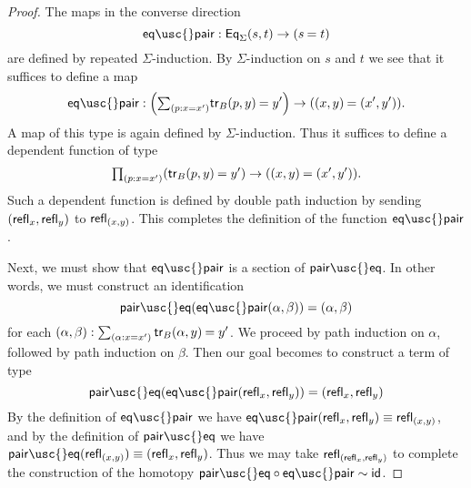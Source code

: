 \begin{proof}
The maps in the converse direction
\begin{equation*}
\mathsf{eq\usc{}pair} : \mathsf{Eq}_\Sigma(s,t)\to(\id{s}{t})
\end{equation*}
are defined by repeated $\Sigma$-induction. By $\Sigma$-induction on $s$ and $t$  we see that it suffices to define a map
\begin{equation*}
\mathsf{eq\usc{}pair} : \Big(\sm{p:x=x'}\id{\mathsf{tr}_B(p,y)}{y'}\Big)\to(\id{(x,y)}{(x',y')}).
\end{equation*}
A map of this type is again defined by $\Sigma$-induction. Thus it suffices to define a dependent function of type
\begin{equation*}
\prd{p:x=x'} (\id{\mathsf{tr}_B(p,y)}{y'}) \to (\id{(x,y)}{(x',y')}).
\end{equation*}
Such a dependent function is defined by double path induction by sending ${\mathopen{}(\mathsf{refl}_{x},\mathsf{refl}_{y})\mathclose{}}$ to $\mathsf{refl}_{{\mathopen{}(x,y)\mathclose{}}}$. This completes the definition of the function $\mathsf{eq\usc{}pair}$.

Next, we must show that $\mathsf{eq\usc{}pair}$ is a section of $\mathsf{pair\usc{}eq}$. In other words, we must construct an identification
\begin{equation*}
\mathsf{pair\usc{}eq}(\mathsf{eq\usc{}pair}(\alpha,\beta))=\pairr{\alpha,\beta}
\end{equation*}
for each $\pairr{\alpha,\beta}:\sm{\alpha:x=x'}\id{\mathsf{tr}_B(\alpha,y)}{y'}$. We proceed by path induction on $\alpha$, followed by path induction on $\beta$. Then our goal becomes to construct a term of type
\begin{equation*}
\mathsf{pair\usc{}eq}(\mathsf{eq\usc{}pair}\pairr{\refl{x},\refl{y}})=\pairr{\refl{x},\refl{y}}
\end{equation*}
By the definition of $\mathsf{eq\usc{}pair}$ we have $\mathsf{eq\usc{}pair}\pairr{\refl{x},\refl{y}}\jdeq \refl{\pairr{x,y}}$, and by the definition of $\mathsf{pair\usc{}eq}$ we have $\mathsf{pair\usc{}eq}(\refl{\pairr{x,y}})\jdeq\pairr{\refl{x},\refl{y}}$. Thus we may take $\mathsf{refl}_{{\mathopen{}(\mathsf{refl}_{x},\mathsf{refl}_{y})\mathclose{}}}$ to complete the construction of the homotopy $\mathsf{pair\usc{}eq}\circ\mathsf{eq\usc{}pair}\htpy\idfunc$.


\end{proof}
